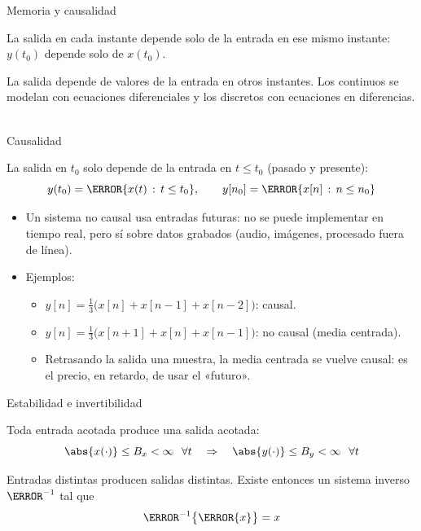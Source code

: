 \documentclass[aspectratio=169,11pt]{beamer}
\begin{document}
\begin{frame}{Memoria y causalidad}
  \begin{definicion}
    La salida en cada instante depende solo de la entrada en ese mismo instante:
    $y(t_0)$ depende solo de $x(t_0)$. \ 
  \end{definicion}
  \begin{definicion}
    La salida depende de valores de la entrada en otros instantes. Los continuos se modelan con ecuaciones diferenciales y los discretos con ecuaciones en diferencias. \ 
  \end{definicion}
\end{frame}

\begin{frame}{Causalidad}
  \begin{definicion}
    La salida en $t_0$ solo depende de la entrada en $t\le t_0$ (pasado y presente):
    \[
      y(t_0)=\T\{x(t)\,:\,t\le t_0\},\qquad y[n_0]=\T\{x[n]\,:\,n\le n_0\}
    \]
  \end{definicion}
  \begin{itemize}
    \item Un sistema \alert{no causal} usa entradas futuras: no se puede implementar en tiempo real, pero sí sobre datos grabados (audio, imágenes, procesado fuera de línea).
    \item Ejemplos:
    \begin{itemize}\small
      \item $y[n]=\frac13\big(x[n]+x[n-1]+x[n-2]\big)$: causal.
      \item $y[n]=\frac13\big(x[n+1]+x[n]+x[n-1]\big)$: no causal (media centrada).
      \item Retrasando la salida una muestra, la media centrada se vuelve causal: es el precio, en retardo, de usar el «futuro».
    \end{itemize}
  \end{itemize}
\end{frame}

\begin{frame}{Estabilidad e invertibilidad}
  \begin{definicion}
    Toda entrada acotada produce una salida acotada:
    \[
      \abs{x(\cdot)}\le B_x<\infty\ \ \forall t\quad\Rightarrow\quad\abs{y(\cdot)}\le B_y<\infty\ \ \forall t
    \]
  \end{definicion}
  \begin{definicion}
    Entradas distintas producen salidas distintas. Existe entonces un sistema inverso $\T^{-1}$ tal que
    \[
      \T^{-1}\big\{\T\{x\}\big\}=x
    \]
  \end{definicion}
\end{frame}
\end{document}
